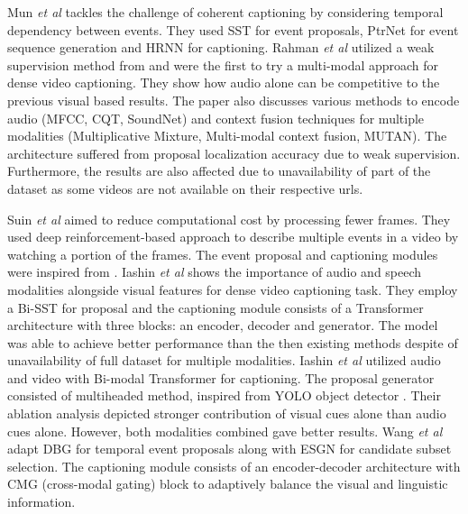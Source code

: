 \par Mun \textit{et al} \cite{mun2019streamlined} tackles the challenge of coherent captioning by considering temporal dependency between events. They used SST for event proposals, PtrNet for event sequence generation and HRNN for captioning. Rahman \textit{et al} \cite{rahman2019watch} utilized a weak supervision method from \cite{duan2018weakly} and were the first to try a multi-modal approach for dense video captioning. They show how audio alone can be competitive to the previous visual based results. The paper also discusses various methods to encode audio (MFCC, CQT, SoundNet) and context fusion techniques for multiple modalities (Multiplicative Mixture, Multi-modal context fusion, MUTAN). The architecture suffered from proposal localization accuracy due to weak supervision. Furthermore, the results are also affected due to unavailability of part of the dataset as some videos are not available on their respective urls.

\par \sloppy Suin \textit{et al} \cite{suin2020efficient} aimed to reduce computational cost by processing fewer frames. They used deep reinforcement-based approach to describe multiple events in a video by watching a portion of the frames. The event proposal and captioning modules were inspired from \cite{zhou2018end}. Iashin \textit{et al} \cite{iashin2020multimodal} shows the importance of audio and speech modalities alongside visual features for dense video captioning task. They employ a Bi-SST for proposal and the captioning module consists of a Transformer architecture with three blocks: an encoder, decoder and generator. The model was able to achieve better performance than the then existing methods despite of unavailability of full dataset for multiple modalities. Iashin \textit{et al} \cite{iashin2020better} utilized audio and video with Bi-modal Transformer for captioning. The proposal generator consisted of multiheaded method, inspired from YOLO object detector \cite{yolo}. Their ablation analysis depicted stronger contribution of visual cues alone than audio cues alone. However, both modalities combined gave better results. Wang \textit{et al} \cite{wang2020densecaptioning} adapt DBG \cite{lin2019fast} for temporal event proposals along with ESGN \cite{mun2019streamlined} for candidate subset selection. The captioning module consists of an encoder-decoder architecture with CMG (cross-modal gating) block to adaptively balance the visual and linguistic information.

